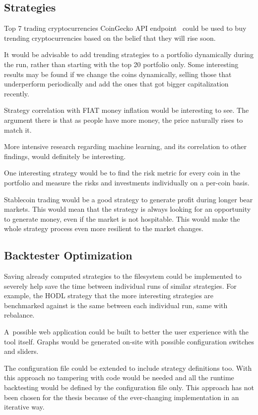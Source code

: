 \subsection*{Strategies}
Top 7 trading cryptocurrencies CoinGecko API endpoint~\cite{coingecko:documentation} could be used to buy trending cryptocurrencies based on the belief that they will rise soon.

It would be advisable to add trending strategies to a portfolio dynamically during the run, rather than starting with the top 20 portfolio only. Some interesting results may be found if we change the coins dynamically, selling those that underperform periodically and add the ones that got bigger capitalization recently.

Strategy correlation with FIAT money inflation would be interesting to see. The argument there is that as people have more money, the price naturally rises to match it.

More intensive research regarding machine learning, and its correlation to other findings, would definitely be interesting.

One interesting strategy would be to find the risk metric for every coin in the portfolio and measure the risks and investments individually on a per-coin basis.

Stablecoin trading would be a good strategy to generate profit during longer bear markets. This would mean that the strategy is always looking for an opportunity to generate money, even if the market is not hospitable. This would make the whole strategy process even more resilient to the market changes.

\subsection*{Backtester Optimization}
Saving already computed strategies to the filesystem could be implemented to severely help save the time between individual runs of similar strategies. For example, the HODL strategy that the more interesting strategies are benchmarked against is the same between each individual run, same with rebalance.

A~possible web application could be built to better the user experience with the tool itself. Graphs would be generated on-site with possible configuration switches and sliders.

The configuration file could be extended to include strategy definitions too. With this approach no tampering with code would be needed and all the runtime backtesting would be defined by the configuration file only. This approach has not been chosen for the thesis because of the ever-changing implementation in an iterative way.

